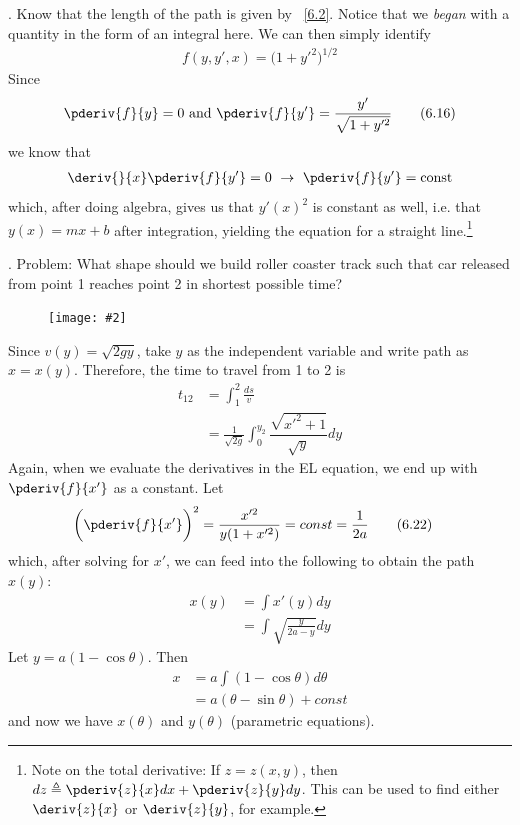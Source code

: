 \documentclass[10pt, twocolumn]{article}
\newcommand\myfig[2][0.3\textwidth]{\begin{figure}[h!]\centering\texttt{[image: \#2]}\end{figure}}
\newcommand{\myspace}{\vspace{3\bigskipamount}}
\newcommand\p{\Needspace{10\baselineskip} \noindent}
\newcommand\tlab[1]{\tag{#1}\label{#1}}
\begin{document}
\subsection{}

\p {}. Know that the length of the path is given by ~\ref{6.2}. Notice that we \textit{began} with a quantity in the form of an integral here. We can then simply identify 
\begin{align}
	f(y, y', x) = \big(1 + y'^2\big)^{1/2} \tlab{6.15}
\end{align}
Since 
\begin{align}
\pderiv{f}{y} = 0 \text{ and } \pderiv{f}{y'} = \frac{y'}{\sqrt{1 + y'^2}} \tlab{6.16}
\end{align}
we know that 
\begin{align}
\deriv{}{x}\pderiv{f}{y'} = 0 ~ \rightarrow  ~ \pderiv{f}{y'} = \text{const}
\end{align}
which, after doing algebra, gives us that $y'(x)^2$ is constant as well, i.e. that $y(x) = m x + b$ after integration, yielding the equation for a straight line.\footnote{Note on the total derivative: If $z =  z(x, y)$, then $dz \triangleq \pderiv{z}{x} dx + \pderiv{z}{y} dy$. This can be used to find either $\deriv{z}{x}$ or $\deriv{z}{y}$, for example.}

\myspace
\p {}. Problem: What shape should we build roller coaster track such that car released from point 1 reaches point 2 in shortest possible time? \myfig{Brach.PNG} 

\p Since $v(y) = \sqrt{2gy}$, take $y$ as the independent variable and write path as $x = x(y)$. Therefore, the time to travel from 1 to 2 is
\begin{align}
t_{12} &= \int_1^2 \frac{ds}{v} \tlab{6.17} \\
&= \frac{1}{\sqrt{2g}} \int_0^{y_2} \dfrac{\sqrt{x'^2 + 1} }{ \sqrt{y} } dy \tlab{6.19}
\end{align}
Again, when we evaluate the derivatives in the EL equation, we end up with $\pderiv{f}{x'}$ as a constant. Let
\begin{align}
\bigg(\pderiv{f}{x'}\bigg)^2 &= \dfrac{x'^2}{y (1 + x'^2)} = const = \frac{1}{2a} \tlab{6.22}
\end{align}
which, after solving for $x'$, we can feed into the following to obtain the path $x(y)$:
\begin{align}
x(y) &= \int x'(y) dy  \\
&= \int \sqrt{\frac{y}{2a - y}} dy \tlab{6.23}
\end{align}
Let $y = a(1 - \cos\theta)$. Then
\begin{align}
x &= a \int (1 - \cos\theta) d\theta \\
&= a(\theta - \sin\theta) + const \tlab{6.25}
\end{align}
and now we have $x(\theta)$ and $y(\theta)$ (parametric equations). 
\end{document}
